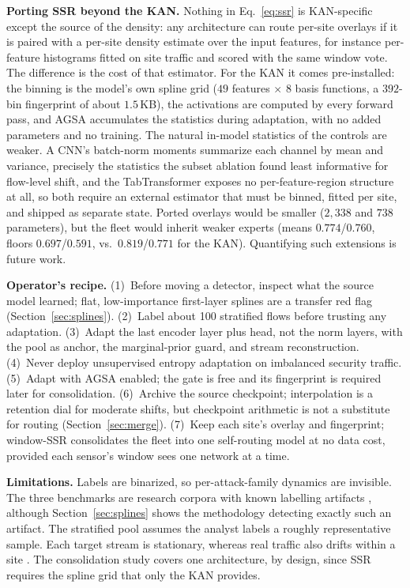 \documentclass[10pt, conference, letterpaper]{IEEEtran}
\begin{document}
\textbf{Porting SSR beyond the KAN.} Nothing in Eq.~\eqref{eq:ssr} is
KAN-specific except the source of the density: any architecture can
route per-site overlays if it is paired with a per-site density
estimate over the input features, for instance per-feature histograms
fitted on site traffic and scored with the same window vote. The
difference is the cost of that estimator. For the KAN it comes
pre-installed: the binning is the model's own spline grid ($49$
features $\times$ $8$ basis functions, a $392$-bin fingerprint of
about $1.5$\,KB), the activations are computed by every forward pass,
and AGSA accumulates the statistics during adaptation, with no added
parameters and no training. The natural in-model statistics of the
controls are weaker. A CNN's batch-norm moments summarize each channel
by mean and variance, precisely the statistics the subset ablation
found least informative for flow-level shift, and the TabTransformer
exposes no per-feature-region structure at all, so both require an
external estimator that must be binned, fitted per site, and shipped
as separate state. Ported overlays would be smaller ($2{,}338$ and
$738$ parameters), but the fleet would inherit weaker experts (means
$0.774$/$0.760$, floors $0.697$/$0.591$, vs.\ $0.819$/$0.771$ for the
KAN). Quantifying such extensions is future work.

\textbf{Operator's recipe.} (1)~Before moving a detector, inspect what
the source model learned; flat, low-importance first-layer splines are
a transfer red flag (Section~\ref{sec:splines}). (2)~Label about 100
stratified flows before trusting any adaptation. (3)~Adapt the last
encoder layer plus head, not the norm layers, with the pool as anchor,
the marginal-prior guard, and stream reconstruction. (4)~Never deploy
unsupervised entropy adaptation on imbalanced security traffic.
(5)~Adapt with AGSA enabled; the gate is free and its fingerprint is
required later for consolidation. (6)~Archive the source checkpoint;
interpolation is a retention dial for moderate shifts, but checkpoint
arithmetic is not a substitute for routing (Section~\ref{sec:merge}).
(7)~Keep each site's overlay and fingerprint; window-SSR consolidates
the fleet into one self-routing model at no data cost, provided each
sensor's window sees one network at a time.

\textbf{Limitations.} Labels are binarized, so per-attack-family
dynamics are invisible. The three benchmarks are research corpora with
known labelling artifacts \cite{apruzzese2022cross}, although
Section~\ref{sec:splines} shows the methodology detecting exactly such
an artifact. The stratified pool assumes the analyst labels a roughly
representative sample. Each target stream is stationary, whereas real
traffic also drifts within a site \cite{andresini2021insomnia}. The
consolidation study covers one architecture, by design, since SSR
requires the spline grid that only the KAN provides.
\end{document}
